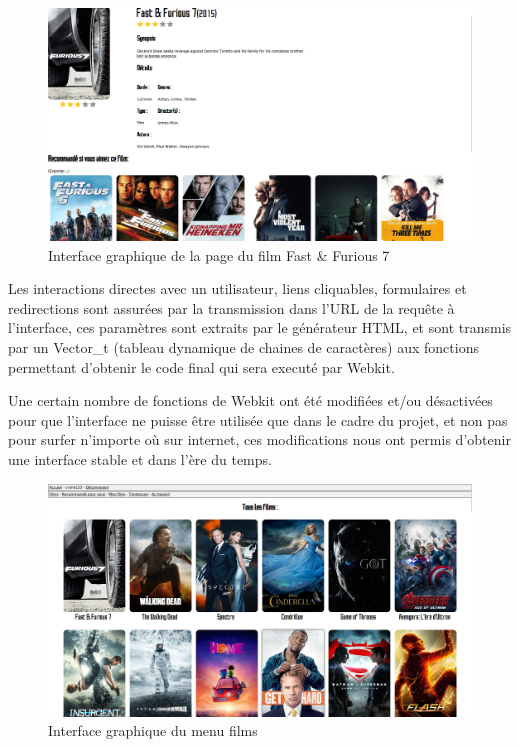 \begin{figure}[H]
	\begin{center}
		\includegraphics[scale=0.20]{img/film_gui.png}
	\end{center}
	\caption{Interface graphique de la page du film Fast \& Furious 7}
\end{figure}

Les interactions directes avec un utilisateur, liens cliquables, formulaires et redirections sont assurées par la transmission dans l'URL de la requête à l'interface, ces paramètres sont extraits par le générateur HTML, et sont transmis par un Vector\_t (tableau dynamique de chaines de caractères) aux fonctions permettant d'obtenir le code final qui sera executé par Webkit.\par
Une certain nombre de fonctions de Webkit ont été modifiées et/ou désactivées pour que l'interface ne puisse être utilisée que dans le cadre du projet, et non pas pour surfer n'importe où sur internet, ces modifications nous ont permis d'obtenir une interface stable et dans l'ère du temps.\par
% 


\begin{figure}[H]
	\begin{center}
		\includegraphics[scale=0.20]{img/films_gui.png}
	\end{center}
	\caption{Interface graphique du menu films}
\end{figure}
